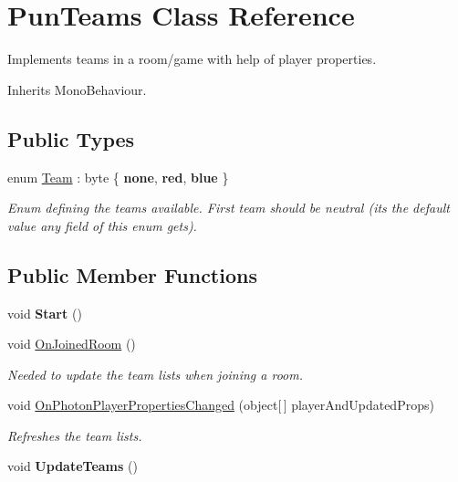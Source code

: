 \hypertarget{class_pun_teams}{}\section{Pun\+Teams Class Reference}
\label{class_pun_teams}


Implements teams in a room/game with help of player properties.  




Inherits Mono\+Behaviour.

\subsection*{Public Types}
\begin{DoxyCompactItemize}
\item 
enum \hyperlink{class_pun_teams_a933d84000474f43931805990b241a2a7}{Team} \+: byte \{ {\bfseries none}, 
{\bfseries red}, 
{\bfseries blue}
 \}\begin{DoxyCompactList}\small\item\em Enum defining the teams available. First team should be neutral (it\textquotesingle{}s the default value any field of this enum gets).\end{DoxyCompactList}
\end{DoxyCompactItemize}
\subsection*{Public Member Functions}
\begin{DoxyCompactItemize}
\item 
void {\bfseries Start} ()\hypertarget{class_pun_teams_a34a0c084356816754542a6299e5cad94}{}\label{class_pun_teams_a34a0c084356816754542a6299e5cad94}

\item 
void \hyperlink{class_pun_teams_a9b844f234f8c18f9336458f14c1e10d5}{On\+Joined\+Room} ()
\begin{DoxyCompactList}\small\item\em Needed to update the team lists when joining a room. \end{DoxyCompactList}\item 
void \hyperlink{class_pun_teams_a8478309a7c3a43014901f5ae2ed3ddc7}{On\+Photon\+Player\+Properties\+Changed} (object\mbox{[}$\,$\mbox{]} player\+And\+Updated\+Props)
\begin{DoxyCompactList}\small\item\em Refreshes the team lists. \end{DoxyCompactList}\item 
void {\bfseries Update\+Teams} ()\hypertarget{class_pun_teams_a03fd4ce6acb2bd7a4b02ac15858740a0}{}\label{class_pun_teams_a03fd4ce6acb2bd7a4b02ac15858740a0}

\end{DoxyCompactItemize}
